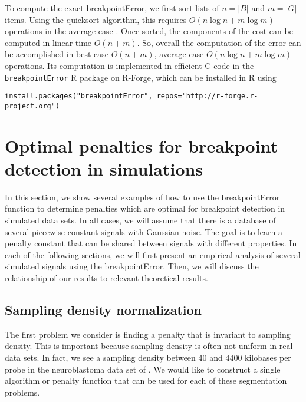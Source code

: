 \documentclass{jsfds} %
\begin{document}
To compute the exact breakpointError, we first sort lists of $n=|B|$
and $m=|G|$ items. Using the quicksort algorithm, this requires
$O(n\log n + m\log m)$ operations in the average case
\citep{clrs}. Once sorted, the components of the cost can be computed
in linear time $O(n + m)$. So, overall the computation of the error
can be accomplished in best case $O(n + m)$, average case $O(n\log n +
m\log m)$ operations. Its computation is implemented in efficient C
code in the \verb|breakpointError| R package on R-Forge, which can be
installed in R using

\begin{verbatim}
install.packages("breakpointError", repos="http://r-forge.r-project.org")
\end{verbatim}


\newpage

\section{Optimal penalties for breakpoint detection in simulations}
\label{sec:simulations}
In this section, we show several examples of how to use the
breakpointError function to determine penalties which are optimal for
breakpoint detection in simulated data sets. In all cases, we will
assume that there is a database of several piecewise constant signals
with Gaussian noise. The goal is to learn a penalty constant that can
be shared between signals with different properties. In each of the
following sections, we will first present an empirical analysis of
several simulated signals using the breakpointError. Then, we will
discuss the relationship of our results to relevant theoretical
results.

\subsection{Sampling density normalization}
\label{variable_density}
The first problem we consider is finding a penalty that is invariant
to sampling density. This is important because sampling density is
often not uniform in real data sets. In fact, we see a sampling
density between 40 and 4400 kilobases per probe in the neuroblastoma
data set of \citet{HOCKING-breakpoints}. We would like to construct a
single algorithm or penalty function that can be used for each of
these segmentation problems.
\end{document}
